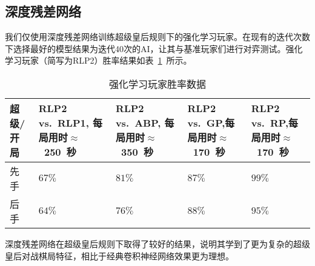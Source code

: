 \subsection{深度残差网络}
我们仅使用深度残差网络训练超级皇后规则下的强化学习玩家。在现有的迭代次数下选择最好的模型结果为迭代40次的AI，让其与基准玩家们进行对弈测试。强化学习玩家（简写为RLP2）胜率结果如表~\ref{table:airesult2}~所示。
\begin{table}[H]
    \centering
    \caption[airesult2]{强化学习玩家胜率数据}
    \begin{tabular}{p{2cm}<{\centering} p{3cm}<{\centering} p{3cm}<{\centering} p{3cm}<{\centering} p{3cm}<{\centering}}
    \hline
    超级/开局 & RLP2 vs.\  RLP1, 每局用时$\approx$~250~秒 & RLP2 vs.\  ABP, 每局用时$\approx$~350~秒 & RLP2 vs.\  GP,每局用时$\approx$~170~秒 & RLP2 vs.\  RP,每局用时$\approx$~170~秒 \\ \hline
    先手 & $67\%$ & $81\%$ & $87\%$ & $99\%$\\ 
    后手 & $64\%$ & $76\%$ & $88\%$ & $95\%$\\ \hline
    \end{tabular}
    \label{table:airesult2}
  \end{table}

深度残差网络在超级皇后规则下取得了较好的结果，说明其学到了更为复杂的超级皇后对战棋局特征，相比于经典卷积神经网络效果更为理想。

